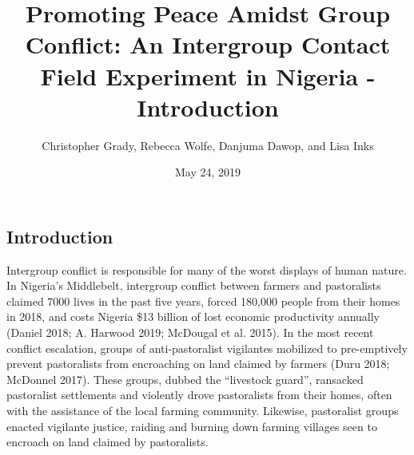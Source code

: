 \documentclass[11pt]{article}
\title{Promoting Peace Amidst Group Conflict: An Intergroup Contact Field
Experiment in Nigeria - Introduction}
\author{
Christopher Grady, Rebecca Wolfe, Danjuma Dawop, and Lisa Inks
}
\date{May 24, 2019}
\begin{document}
\VerbatimFootnotes

%
%
%
%
%
%
%
%
%
%

\maketitle

\subsection{Introduction}\label{introduction}

Intergroup conflict is responsible for many of the worst displays of
human nature. In Nigeria's Middlebelt, intergroup conflict between
farmers and pastoralists claimed 7000 lives in the past five years,
forced 180,000 people from their homes in 2018, and costs Nigeria \$13
billion of lost economic productivity annually (Daniel 2018; A. Harwood
2019; McDougal et al. 2015). In the most recent conflict escalation,
groups of anti-pastoralist vigilantes mobilized to pre-emptively prevent
pastoralists from encroaching on land claimed by farmers (Duru 2018;
McDonnel 2017). These groups, dubbed the ``livestock guard'', ransacked
pastoralist settlements and violently drove pastoralists from their
homes, often with the assistance of the local farming community.
Likewise, pastoralist groups enacted vigilante justice, raiding and
burning down farming villages seen to encroach on land claimed by
pastoralists.
\end{document}
